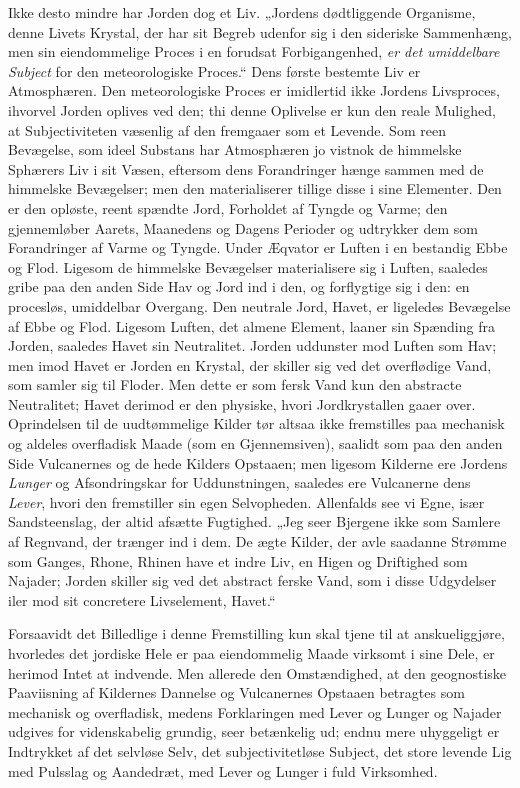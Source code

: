 \documentclass[12pt,a4paper]{book}
\begin{document}
Ikke desto mindre har Jorden dog et Liv. „Jordens dødtliggende Organisme, denne
Livets Krystal, der har sit Begreb udenfor sig i den sideriske Sammenhæng, men
sin eiendommelige Proces i en forudsat Forbigangenhed, \emph{er det umiddelbare
Subject} for den meteorologiske Proces.“ Dens første bestemte Liv er
Atmosphæren. Den meteorologiske Proces er imidlertid ikke Jordens Livsproces,
ihvorvel Jorden oplives ved den; thi denne Oplivelse er kun den reale Mulighed,
at Subjectiviteten væsenlig af den fremgaaer som et Levende. Som reen
Bevægelse, som ideel Substans har Atmosphæren jo vistnok de himmelske Sphærers
Liv i sit Væsen, eftersom dens Forandringer hænge sammen med de himmelske
Bevægelser; men den materialiserer tillige disse i sine Elementer. Den er den
opløste, reent spændte Jord, Forholdet af Tyngde og Varme; den gjennemløber
Aarets, Maanedens og Dagens Perioder og udtrykker dem som Forandringer af Varme
og Tyngde. Under Æqvator er Luften i en bestandig Ebbe og Flod. Ligesom de
himmelske Bevægelser materialisere sig i Luften, saaledes gribe paa den anden
Side Hav og Jord ind i den, og forflygtige sig i den: en procesløs, umiddelbar
Overgang. Den neutrale Jord, Havet, er ligeledes Bevægelse af Ebbe og Flod.
Ligesom Luften, det almene Element, laaner sin Spænding fra Jorden, saaledes
Havet sin Neutralitet. Jorden uddunster mod Luften som Hav; men imod Havet er
Jorden en Krystal,
der skiller sig ved det overflødige Vand, som samler sig til Floder. Men dette
er som fersk Vand kun den abstracte Neutralitet; Havet derimod er den physiske,
hvori Jordkrystallen gaaer over. Oprindelsen til de uudtømmelige Kilder tør
altsaa ikke fremstilles paa mechanisk og aldeles overfladisk Maade (som en
Gjennemsiven), saalidt som paa den anden Side Vulcanernes og de hede Kilders
Opstaaen; men ligesom Kilderne ere Jordens \emph{Lunger} og Afsondringskar for
Uddunstningen, saaledes ere Vulcanerne dens \emph{Lever}, hvori den fremstiller
sin egen Selvopheden. Allenfalds see vi Egne, især Sandsteenslag, der altid
afsætte Fugtighed. „Jeg seer Bjergene ikke som Samlere af Regnvand, der trænger
ind i dem. De ægte Kilder, der avle saadanne Strømme som Ganges, Rhone, Rhinen
have et indre Liv, en Higen og Driftighed som Najader; Jorden skiller sig ved
det abstract ferske Vand, som i disse Udgydelser iler mod sit concretere
Livselement, Havet.“

Forsaavidt det Billedlige i denne Fremstilling kun skal tjene til at
anskueliggjøre, hvorledes det jordiske Hele er paa eiendommelig Maade virksomt
i sine Dele, er herimod Intet at indvende. Men allerede den Omstændighed, at
den geognostiske Paaviisning af Kildernes Dannelse og Vulcanernes Opstaaen
betragtes som mechanisk og overfladisk, medens Forklaringen med Lever og Lunger
og Najader udgives for videnskabelig grundig, seer betænkelig ud; endnu mere
uhyggeligt er Indtrykket af det selvløse Selv, det subjectivitetløse Subject,
det store levende Lig med Pulsslag og Aandedræt, med Lever og Lunger i fuld
Virksomhed.
\end{document}
